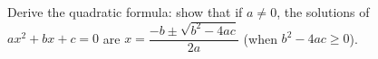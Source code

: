 Derive the quadratic formula: show that if $a\ne0$, the solutions of $ax^2+bx+c=0$ are $x=\dfrac{-b\pm\sqrt{b^2-4ac}}{2a}$ (when $b^2-4ac\ge0$).
